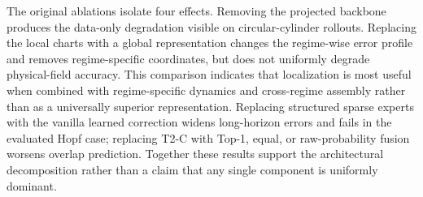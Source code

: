\begin{table}[t]
\centering
\caption{Compact ablation summary using existing headline metrics. Regime columns report circular-cylinder $E_u/E_p$ ranges; the overlap column reports centered-square $S$--$H$/$H$--$P$ joint errors at $K=24$. A dash indicates that the comparison does not modify that component.}
\label{tab:compact_ablation}
\scriptsize
\setlength{\tabcolsep}{2.2pt}
\end{table}

The original ablations isolate four effects. Removing the projected backbone produces the data-only degradation visible on circular-cylinder rollouts. Replacing the local charts with a global representation changes the regime-wise error profile and removes regime-specific coordinates, but does not uniformly degrade physical-field accuracy. This comparison indicates that localization is most useful when combined with regime-specific dynamics and cross-regime assembly rather than as a universally superior representation. Replacing structured sparse experts with the vanilla learned correction widens long-horizon errors and fails in the evaluated Hopf case; replacing T2-C with Top-1, equal, or raw-probability fusion worsens overlap prediction. Together these results support the architectural decomposition rather than a claim that any single component is uniformly dominant.
